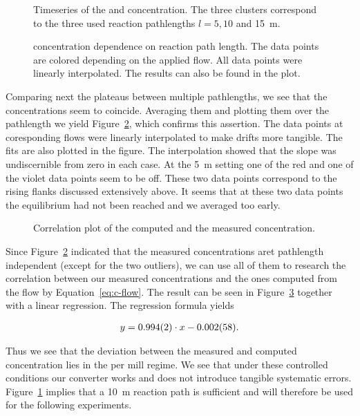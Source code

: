\begin{figure}[htbp]
  \centering
  
  \hfill
  
  \caption{Timeseries of the  and  concentration. The
    three clusters correspond to the three used reaction pathlengths
    $l = 5, 10$ and \SI{15}{\meter}.}
  \label{fig:ts}
\end{figure}
\begin{figure}[H]
  \centering
  
  \caption{ concentration dependence on reaction path
    length. The data points are colored depending on the applied
     flow. All data points were linearly interpolated. The
    results can also be found in the plot.}
  \label{fig:no-length}
\end{figure}

Comparing next the  plateaus between multiple pathlengths, we
see that the concentrations seem to coincide. Averaging them and
plotting them over the pathlength we yield Figure~\ref{fig:no-length},
which confirms this assertion. The data points at coresponding flows
were linearly interpolated to make drifts more tangible. The fits are
also plotted in the figure. The interpolation showed that the slope
was undiscernible from zero in each case. At the \SI{5}{\meter}
setting one of the red and one of the violet data points seem to be
off. These two data points correspond to the rising flanks discussed
extensively above. It seems that at these two data points the
equilibrium had not been reached and we averaged too early.

\begin{figure}[htbp]
  \centering
  
  \caption{Correlation plot of the computed and the measured 
    concentration.}
  \label{fig:no-calib}
\end{figure}

Since Figure~\ref{fig:no-length} indicated that the measured
concentrations aret pathlength independent (except for the two outliers),
we can use all of them to research the correlation between our
measured concentrations and the ones computed from the flow by
Equation~\eqref{eq:c-flow}. The result can be seen in
Figure~\ref{fig:no-calib} together with a linear regression. The
regression formula yields

\begin{align*}
  y = \num{0.994 \pm 0.002}  \cdot x -\num{0.002 \pm 0.058}.
\end{align*}

Thus we see that the deviation between the measured and computed
concentration lies in the per mill regime. We see that under these
controlled conditions our converter works and does not introduce
tangible systematic errors. Figure~\ref{fig:ts} implies that a
\SI{10}{\meter} reaction path is sufficient and will therefore be used
for the following experiments.

